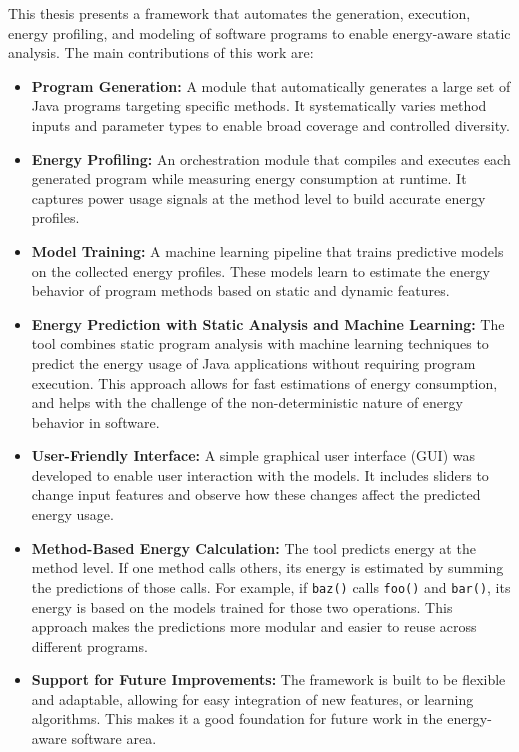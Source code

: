 This thesis presents a framework that automates the generation, execution, energy profiling, and modeling of software programs to enable energy-aware static analysis. The main contributions of this work are:

\begin{itemize}
    \item \textbf{Program Generation:} A module that automatically generates a large set of Java programs targeting specific methods. It systematically varies method inputs and parameter types to enable broad coverage and controlled diversity.

    \item \textbf{Energy Profiling:} An orchestration module that compiles and executes each generated program while measuring energy consumption at runtime. It captures power usage signals at the method level to build accurate energy profiles.

    \item \textbf{Model Training:} A machine learning pipeline that trains predictive models on the collected energy profiles. These models learn to estimate the energy behavior of program methods based on static and dynamic features.
    
    \item \textbf{Energy Prediction with Static Analysis and Machine Learning:} The tool combines static program analysis with machine learning techniques to predict the energy usage of Java applications without requiring program execution. This approach allows for fast estimations of energy consumption, and helps with the challenge of the non-deterministic nature of energy behavior in software.

    \item \textbf{User-Friendly Interface:} A simple graphical user interface (GUI) was developed to enable user interaction with the models. It includes sliders to change input features and observe how these changes affect the predicted energy usage.
    
    \item \textbf{Method-Based Energy Calculation:} The tool predicts energy at the method level. If one method calls others, its energy is estimated by summing the predictions of those calls. {\color{blue}For example, if \texttt{baz()} calls \texttt{foo()} and \texttt{bar()}, its energy is based on the models trained for those two operations. This approach makes the predictions more modular and easier to reuse across different programs.}

    \item \textbf{Support for Future Improvements:} The framework is built to be flexible and adaptable, allowing for easy integration of new features, or learning algorithms. This makes it a good foundation for future work in the energy-aware software area.
\end{itemize}



